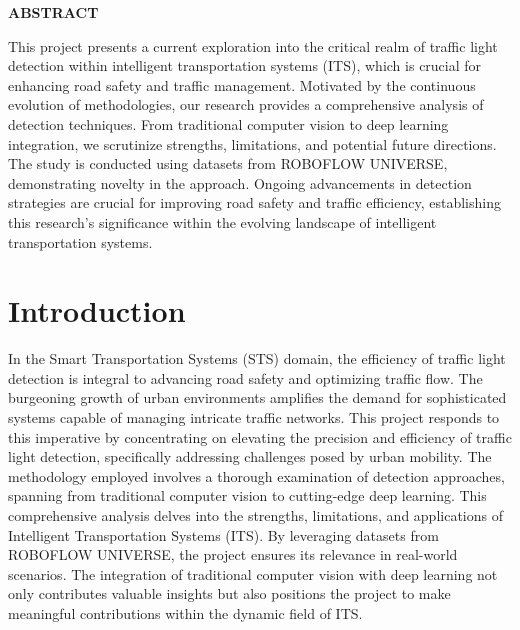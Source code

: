 \documentclass[12 pt]{report}
\begin{document}
\newpage
\begin{center}
  \begin{Large}
    \textbf{ABSTRACT}
  \end{Large}
\end{center}
This project presents a current exploration into the critical realm of traffic light detection within intelligent transportation systems (ITS), which is crucial for enhancing road safety and traffic management. Motivated by the continuous evolution of methodologies, our research provides a comprehensive analysis of detection techniques. From traditional computer vision to deep learning integration, we scrutinize strengths, limitations, and potential future directions. The study is conducted using datasets from ROBOFLOW UNIVERSE, demonstrating novelty in the approach. Ongoing advancements in detection strategies are crucial for improving road safety and traffic efficiency, establishing this research's significance within the evolving landscape of intelligent transportation systems.
\flushright

\newpage
\tableofcontents

\flushleft
\newpage
\chapter{Introduction}
In the Smart Transportation Systems (STS) domain, the efficiency of traffic light detection is integral to advancing road safety and optimizing traffic flow. The burgeoning growth of urban environments amplifies the demand for sophisticated systems capable of managing intricate traffic networks. This project responds to this imperative by concentrating on elevating the precision and efficiency of traffic light detection, specifically addressing challenges posed by urban mobility. The methodology employed involves a thorough examination of detection approaches, spanning from traditional computer vision to cutting-edge deep learning. This comprehensive analysis delves into the strengths, limitations, and applications of Intelligent Transportation Systems (ITS). By leveraging datasets from ROBOFLOW UNIVERSE, the project ensures its relevance in real-world scenarios. The integration of traditional computer vision with deep learning not only contributes valuable insights but also positions the project to make meaningful contributions within the dynamic field of ITS.
\flushleft
\end{document}
